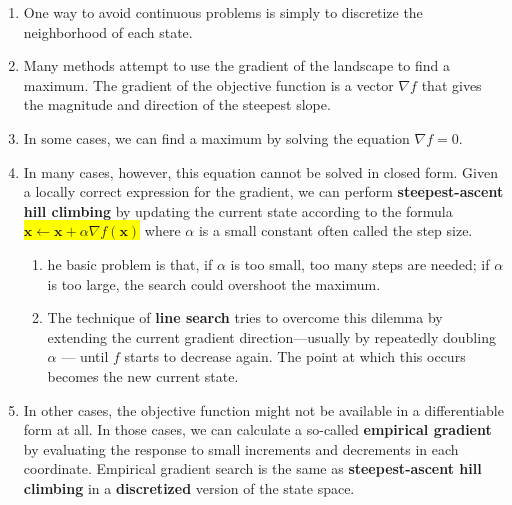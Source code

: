 \begin{enumerate}
    \item One way to avoid continuous problems is simply to discretize the neighborhood of each state.
    \hfill \cite{ai/book/Artificial-Intelligence-A-Modern-Approach/Russell-Norvig}

    \item Many methods attempt to use the gradient of the landscape to find a maximum.
    The gradient of the objective function is a vector $\nabla f$ that gives the magnitude and direction of the steepest slope.
    \hfill \cite{ai/book/Artificial-Intelligence-A-Modern-Approach/Russell-Norvig}

    \item In some cases, we can find a maximum by solving the equation $\nabla f = 0$.
    \hfill \cite{ai/book/Artificial-Intelligence-A-Modern-Approach/Russell-Norvig}

    \item In many cases, however, this equation cannot be solved in closed form.
    Given a locally correct expression for the gradient, we can perform \textbf{steepest-ascent hill climbing} by updating the current state according to the formula \colorbox{yellow}{$\bm{x} \gets \bm{x} + \alpha \nabla f(\bm{x})$} where $\alpha$ is a small constant often called the step size.
    \hfill \cite{ai/book/Artificial-Intelligence-A-Modern-Approach/Russell-Norvig}
    \begin{enumerate}
        \item he basic problem is that, if $\alpha$ is too small, too many steps are needed; if $\alpha$ is too large, the search could overshoot the maximum.
        \hfill \cite{ai/book/Artificial-Intelligence-A-Modern-Approach/Russell-Norvig}

        \item The technique of \textbf{line search} tries to overcome this dilemma by extending the current gradient direction—usually by repeatedly doubling $\alpha$ — until $f$ starts to decrease again.
        The point at which this occurs becomes the new current state.
        \hfill \cite{ai/book/Artificial-Intelligence-A-Modern-Approach/Russell-Norvig}
    \end{enumerate}

    \item In other cases, the objective function might not be available in a differentiable form at all.
    In those cases, we can calculate a so-called \textbf{empirical gradient} by evaluating the response to small increments and decrements in each coordinate.
    Empirical gradient search is the same as \textbf{steepest-ascent hill climbing} in a \textbf{discretized} version of the state space.
    \hfill \cite{ai/book/Artificial-Intelligence-A-Modern-Approach/Russell-Norvig}


\end{enumerate}
